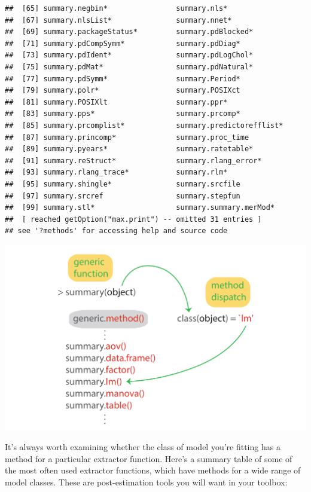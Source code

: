 \documentclass[]{book}
\begin{document}
\begin{verbatim}
##  [65] summary.negbin*                summary.nls*                  
##  [67] summary.nlsList*               summary.nnet*                 
##  [69] summary.packageStatus*         summary.pdBlocked*            
##  [71] summary.pdCompSymm*            summary.pdDiag*               
##  [73] summary.pdIdent*               summary.pdLogChol*            
##  [75] summary.pdMat*                 summary.pdNatural*            
##  [77] summary.pdSymm*                summary.Period*               
##  [79] summary.polr*                  summary.POSIXct               
##  [81] summary.POSIXlt                summary.ppr*                  
##  [83] summary.pps*                   summary.prcomp*               
##  [85] summary.prcomplist*            summary.predictorefflist*     
##  [87] summary.princomp*              summary.proc_time             
##  [89] summary.pyears*                summary.ratetable*            
##  [91] summary.reStruct*              summary.rlang_error*          
##  [93] summary.rlang_trace*           summary.rlm*                  
##  [95] summary.shingle*               summary.srcfile               
##  [97] summary.srcref                 summary.stepfun               
##  [99] summary.stl*                   summary.summary.merMod*       
##  [ reached getOption("max.print") -- omitted 31 entries ]
## see '?methods' for accessing help and source code
\end{verbatim}

\includegraphics{R/Rmodels/images/methods.png}

It's always worth examining whether the class of model you're fitting has a method for a particular extractor function.
Here's a summary table of some of the most often used extractor functions, which have methods for a wide range of model classes. These are post-estimation tools you will want in your toolbox:
\end{document}
